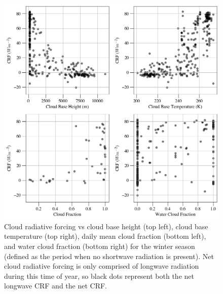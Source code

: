 \begin{figure}[h]
    \centering
    \includegraphics[width=1\linewidth]{figures/chapter4/VSWinter.png}
    \caption[Cloud radiative forcing vs cloud base height, cloud base temperature, cloud fraction, and water cloud fraction for winter.]{Cloud radiative forcing vs cloud base height (top left), cloud base temperature (top right), daily mean cloud fraction (bottom left), and water cloud fraction (bottom right) for the winter season (defined as the period when no shortwave radiation is present). Net cloud radiative forcing is only comprised of longwave radiation during this time of year, so black dots represent both the net longwave CRF and the net CRF.}
    \label{fig:winter:crf}
\end{figure}

